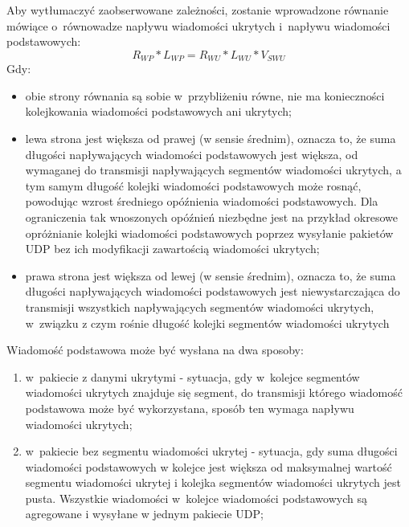 \documentclass[a4paper, twoside, openright, 12pt]{report}
\begin{document}
            Aby wytłumaczyć zaobserwowane zależności, zostanie wprowadzone równanie
            mówiące o~równowadze napływu wiadomości ukrytych i~napływu wiadomości podstawowych:
            \begin{equation} \label{ROWNANIEROWNOWAGI}
            R_{WP} * L_{WP} = R_{WU} * L_{WU} * V_{SWU}
            \end{equation}
            Gdy:
            \begin{itemize}
                \item obie strony równania są sobie w~przybliżeniu równe, nie ma konieczności
            kolejkowania wiadomości podstawowych ani ukrytych;
                \item lewa strona jest
            większa od prawej (w sensie średnim), oznacza to, że suma długości napływających wiadomości podstawowych
            jest większa, od wymaganej do transmisji napływających segmentów wiadomości ukrytych,
            a tym samym długość kolejki wiadomości podstawowych może rosnąć, powodując
            wzrost średniego opóźnienia wiadomości podstawowych. Dla ograniczenia tak
            wnoszonych opóźnień niezbędne jest na przykład okresowe opróżnianie kolejki
            wiadomości podstawowych poprzez wysyłanie pakietów UDP bez ich modyfikacji
            zawartością wiadomości ukrytych;
                \item prawa strona jest
            większa od lewej (w sensie średnim), oznacza to, że suma długości napływających wiadomości
            podstawowych jest niewystarczająca do transmisji wszystkich napływających
            segmentów wiadomości ukrytych, w~związku z czym rośnie długość kolejki
            segmentów wiadomości ukrytych
    \end{itemize}

            Wiadomość podstawowa może być wysłana na dwa sposoby:
            \begin{enumerate}
                \item w~pakiecie z danymi ukrytymi - sytuacja, gdy w~kolejce
                    segmentów wiadomości ukrytych znajduje się segment, do transmisji którego
                    wiadomość podstawowa może być wykorzystana, sposób ten wymaga
                    napływu wiadomości ukrytych;
                \item w~pakiecie bez segmentu wiadomości ukrytej - sytuacja, gdy suma długości wiadomości
                    podstawowych w kolejce jest większa od
                    maksymalnej wartość segmentu wiadomości ukrytej i kolejka segmentów wiadomości
                    ukrytych jest pusta. Wszystkie wiadomości w~kolejce wiadomości
                    podstawowych są agregowane i wysyłane w jednym pakiecie UDP;
            \end{enumerate}
\end{document}
